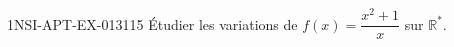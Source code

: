 \begin{exercice}{1NSI-APT-EX-013}{1}{15}
Étudier les variations de $f(x) = \dfrac{x^2+1}{x}$ sur $\mathbb{R}^*$.

\end{exercice}
